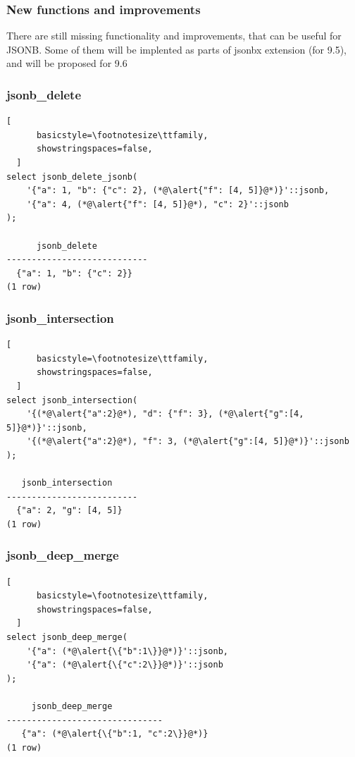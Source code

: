\documentclass[14pt, compress]{beamer}
\begin{document}
\begin{frame}[fragile]
  \frametitle{New functions and improvements}

  There are still missing functionality and improvements, that can be useful for JSONB.
  Some of them will be implented as parts of jsonbx extension (for 9.5), and will be proposed for 9.6
\end{frame}

\begin{frame}[fragile]
  \frametitle{jsonb\_delete}

  \begin{lstlisting}[
      basicstyle=\footnotesize\ttfamily,
      showstringspaces=false,
  ]
select jsonb_delete_jsonb(
    '{"a": 1, "b": {"c": 2}, (*@\alert{"f": [4, 5]}@*)}'::jsonb,
    '{"a": 4, (*@\alert{"f": [4, 5]}@*), "c": 2}'::jsonb
);

      jsonb_delete
----------------------------
  {"a": 1, "b": {"c": 2}}
(1 row)

  \end{lstlisting}

\end{frame}

\begin{frame}[fragile]
  \frametitle{jsonb\_intersection}

  \begin{lstlisting}[
      basicstyle=\footnotesize\ttfamily,
      showstringspaces=false,
  ]
select jsonb_intersection(
    '{(*@\alert{"a":2}@*), "d": {"f": 3}, (*@\alert{"g":[4, 5]}@*)}'::jsonb,
    '{(*@\alert{"a":2}@*), "f": 3, (*@\alert{"g":[4, 5]}@*)}'::jsonb
);

   jsonb_intersection
--------------------------
  {"a": 2, "g": [4, 5]}
(1 row)

  \end{lstlisting}

\end{frame}

\begin{frame}[fragile]
  \frametitle{jsonb\_deep\_merge}

  \begin{lstlisting}[
      basicstyle=\footnotesize\ttfamily,
      showstringspaces=false,
  ]
select jsonb_deep_merge(
    '{"a": (*@\alert{\{"b":1\}}@*)}'::jsonb,
    '{"a": (*@\alert{\{"c":2\}}@*)}'::jsonb
);

     jsonb_deep_merge            
-------------------------------
   {"a": (*@\alert{\{"b":1, "c":2\}}@*)}
(1 row)

  \end{lstlisting}

\end{frame}
\end{document}
